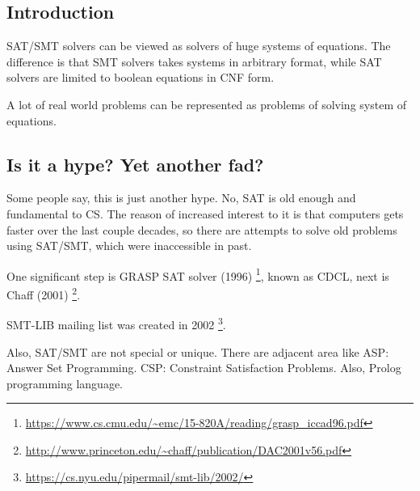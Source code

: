 \subsection{Introduction}

\ac{SAT}/\ac{SMT} solvers can be viewed as solvers of huge systems of equations.
The difference is that \ac{SMT} solvers takes systems in arbitrary format,
while \ac{SAT} solvers are limited to boolean equations in \ac{CNF} form.

A lot of real world problems can be represented as problems of solving system of equations.

\subsection{Is it a hype? Yet another fad?}

Some people say, this is just another hype.
No, \ac{SAT} is old enough and fundamental to \ac{CS}.
The reason of increased interest to it is that computers gets faster over the last couple decades,
so there are attempts to solve old problems using \ac{SAT}/\ac{SMT}, which were inaccessible in past.

One significant step is GRASP SAT solver (1996)
\footnote{\url{https://www.cs.cmu.edu/~emc/15-820A/reading/grasp_iccad96.pdf}}, known as \ac{CDCL},
next is Chaff (2001)
\footnote{\url{http://www.princeton.edu/~chaff/publication/DAC2001v56.pdf}}.

SMT-LIB mailing list was created in 2002
\footnote{\url{https://cs.nyu.edu/pipermail/smt-lib/2002/}}.

Also, SAT/SMT are not special or unique.
There are adjacent area like ASP: Answer Set Programming.
CSP: Constraint Satisfaction Problems.
Also, Prolog programming language.


